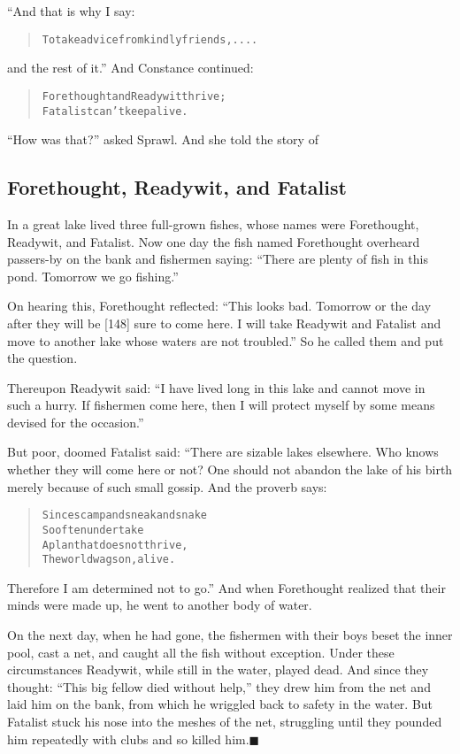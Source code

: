 \documentclass[article, twoside, 14pt]{memoir}
\newcommand{\qed}{\hfill \ensuremath{\blacksquare}}
\renewenvironment{verbatim}{%
\begin{quote}%
\vskip -10pt%
\begin{alltt}\normalfont\large}{\end{alltt}%
\end{quote}%
\vskip -10pt
} %
\begin{document}
“And that is why I say:

\begin{verbatim}
To take advice from kindly friends, ....
\end{verbatim}
and the rest of it.” And Constance continued:

\begin{verbatim}
Forethought and Ready wit thrive;
Fatalist can't keep alive.
\end{verbatim}
``How was that?'' asked Sprawl. And she told the story of

\subsection{Forethought, Readywit, and Fatalist}

\label{s20}

In a great lake lived three full-grown fishes, whose names were
Forethought, Readywit, and Fatalist. Now one day the fish named
Forethought overheard passers-by on the bank and fishermen saying:
``There are plenty of fish in this pond. Tomorrow we go fishing.''

On hearing this, Forethought reflected:
``This looks bad. Tomorrow or the day after they will be [148] sure to come here. I will take Readywit and Fatalist and move to another lake whose waters are not troubled.''
So he called them and put the question.

Thereupon Readywit said:
``I have lived long in this lake and cannot move in such a hurry. If fishermen come here, then I will protect myself by some means devised for the occasion.''

But poor, doomed Fatalist said: “There are sizable lakes elsewhere.
Who knows whether they will come here or not? One should not
abandon the lake of his birth merely because of such small gossip.
And the proverb says:

\begin{verbatim}
Since scamp and sneak and snake
So often undertake
A plan that does not thrive,
The world wags on, alive.
\end{verbatim}
Therefore I am determined not to go.” And when Forethought realized
that their minds were made up, he went to another body of water.

On the next day, when he had gone, the fishermen with their boys
beset the inner pool, cast a net, and caught all the fish without
exception. Under these circumstances Readywit, while still in the
water, played dead. And since they thought:
``This big fellow died without help,'' they drew him from the net
and laid him on the bank, from which he wriggled back to safety in
the water. But Fatalist stuck his nose into the meshes of the net,
struggling until they pounded him repeatedly with clubs and so
killed him.\hyperref[s20]{\qed}
\end{document}
